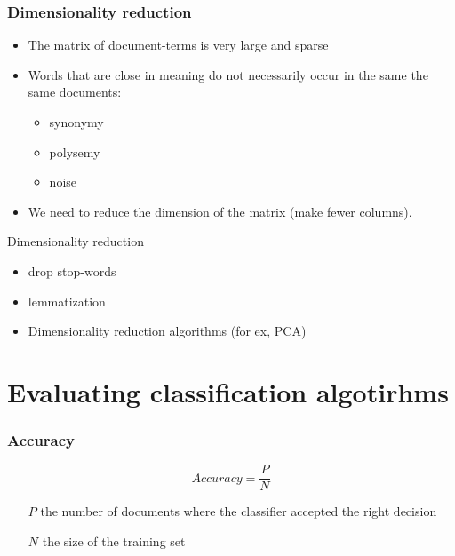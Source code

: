 \documentclass[svgnames]{beamer}
\begin{document}
\begin{frame}
  \frametitle{Dimensionality reduction}
  \begin{itemize}

\item The matrix of document-terms is very large and sparse
  \item Words that are close in meaning do not necessarily occur in the same
    the same documents:
    \begin{itemize}
    \item synonymy
    \item polysemy
    \item noise
    \end{itemize}
    \pause
  \item We need to reduce the dimension of the matrix (make fewer columns).
  \end{itemize}
\end{frame}

\begin{frame}{Dimensionality reduction}
\begin{itemize}
  \item drop stop-words
  \item lemmatization
  \item Dimensionality reduction algorithms (for ex, PCA)
\end{itemize}
\end{frame}

\section{Evaluating classification algotirhms}
\begin{frame}
  \frametitle{Accuracy}
  \begin{equation}
    \label{eq:a}
    Accuracy = \frac{P}{N}
  \end{equation}
  \begin{itemize}
  \item[$P$] the number of documents where the classifier accepted
    the right decision
  \item[$N$] the size of the training set
  \end{itemize}
\end{frame}
\end{document}
